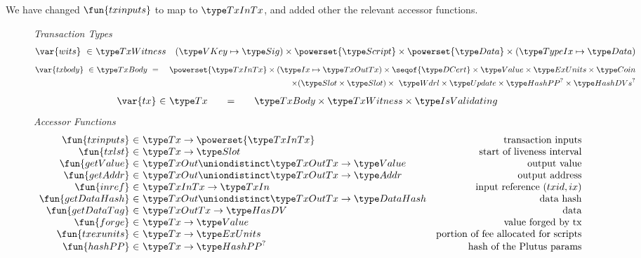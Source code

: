 We have changed $\fun{txinputs}$ to map to $\TxInTx$, and added other the relevant
accessor functions.

\begin{figure*}[htb]
  \emph{Transaction Types}
  \begin{align*}
    \var{wits} ~\in~ & \TxWitness & (\VKey \mapsto \Sig) \times \powerset{\Script} \times \powerset{\Data}
    \times (\TypeIx \mapsto \Data)
  \end{align*}
  \begin{align*}
    \var{txbody} ~\in~
    & \TxBody ~=~
    & \powerset{\TxInTx} \times (\Ix \mapsto \TxOutTx) \times \seqof{\DCert}
      \times \Value \times \ExUnits \times \Coin \\
    & ~& \times (\Slot\times\Slot) \times~ \Wdrl \times \Update \times \HashPP^? \times \HashDVs^?
  \end{align*}
  \begin{equation*}
    \begin{array}{r@{~\in~}l@{\qquad=\qquad}l}
      \var{tx}
      & \Tx
      & \TxBody \times \TxWitness \times \IsValidating
    \end{array}
  \end{equation*}
  \emph{Accessor Functions}
  \begin{equation*}
    \begin{array}{r@{~\in~}lr}
      \fun{txinputs} & \Tx \to \powerset{\TxInTx} & \text{transaction inputs} \\
      \fun{txlst} & \Tx \to \Slot & \text{start of liveness interval} \\
      \fun{getValue} & \TxOut \uniondistinct \TxOutTx \to \Value & \text{output value} \\
      \fun{getAddr} & \TxOut \uniondistinct \TxOutTx \to \Addr & \text{output address} \\
      \fun{inref} & \TxInTx \to \TxIn & \text{input reference $(txid,ix)$} \\
      \fun{getDataHash} & \TxOut \uniondistinct \TxOutTx \to \DataHash & \text{data hash} \\
      \fun{getDataTag} & \TxOutTx \to \HasDV & \text{data} \\
      \fun{forge} & \Tx \to \Value & \text{value forged by tx}\\
      \fun{txexunits} & \Tx \to \ExUnits & \text{portion of fee allocated for scripts}\\
      \fun{hashPP} & \Tx \to \HashPP^? & \text{hash of the Plutus params}\\

\end{array}
\end{equation*}
\end{figure*}
